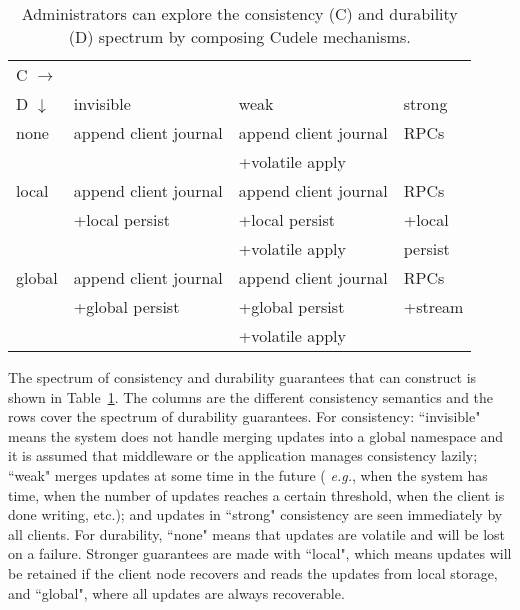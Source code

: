 \begin{table}[t]
\begin{center}
\begin{tabular}{ l | l | l | l }
  C \(\rightarrow\) &&& \\  
  D \(\downarrow\)  	     & invisible         & weak        & strong  \\\hline
  none                       & append client journal            & append client journal          & RPCs    \\
                             &                   & +volatile apply &         \\\hdashline
  local                      & append client journal            & append client journal          & RPCs    \\
                             & +local persist    & +local persist  & +local  \\
                             &                   & +volatile apply &  persist\\\hdashline
  global                     & append client journal            & append client journal          & RPCs    \\
                             & +global persist   & +global persist & +stream \\
                             &                   & +volatile apply &         \\
\end{tabular}

\caption{Administrators can explore the consistency (C) and
durability (D) spectrum by composing Cudele mechanisms. 
\label{table:spectrum}}
\end{center}
\end{table}

The spectrum of consistency and durability guarantees that
 can construct is shown in
Table~\ref{table:spectrum}. The columns are the different consistency semantics
and the rows cover the spectrum of durability guarantees.  For consistency:
``invisible" means the system does not handle merging updates into a global
namespace and it is assumed that middleware or the application manages
consistency lazily; ``weak" merges updates at some time in the future ({\it
e.g.}, when the system has time, when the number of updates reaches a certain
threshold, when the client is done writing, etc.); and updates in ``strong"
consistency are seen immediately by all clients. For durability, ``none" means
that updates are volatile and will be lost on a failure. Stronger guarantees
are made with ``local", which means updates will be retained if the client node
recovers and reads the updates from local storage, and ``global", where all
updates are always recoverable.

